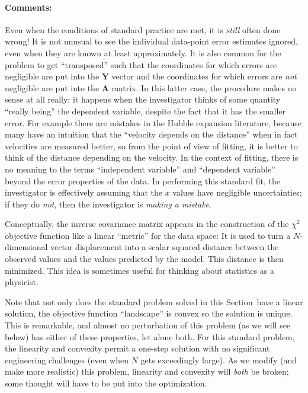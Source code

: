 \documentclass[12pt,twoside]{article}
\newcommand{\sectionname}{Section}
\newcommand{\commentsname}{Comments}
\newcounter{problem}
\newenvironment{comments}{\paragraph{\commentsname:}}{}
\newcommand{\mmatrix}[1]{\boldsymbol{#1}}
\newcommand{\mA}{\mmatrix{A}}
\newcommand{\mY}{\mmatrix{Y}}
\begin{document}
\begin{comments}
Even when the conditions of standard practice are met, it is
\emph{still} often done wrong!  It is not unusual to see the
individual data-point error estimates ignored, even when they are
known at least approximately.  It is also common for the problem to
get ``transposed'' such that the coordinates for which errors are
negligible are put into the $\mY$ vector and the coordinates for which
errors are \emph{not} negligible are put into the $\mA$ matrix.  In
this latter case, the procedure makes no sense at all really; it
happens when the investigator thinks of some quantity ``really being''
the dependent variable, despite the fact that it has the smaller
error.  For example there are mistakes in the Hubble expansion
literature, because many have an intuition that the ``velocity depends
on the distance'' when in fact velocities are measured better, so from
the point of view of fitting, it is better to think of the distance
depending on the velocity.  In the context of fitting, there is no
meaning to the terms ``independent variable'' and ``dependent
variable'' beyond the error properties of the data.  In performing
this standard fit, the investigator is effectively assuming that the
$x$ values have negligible uncertainties; if they do \emph{not}, then
the investigator is \emph{making a mistake}.

Conceptually, the inverse covariance matrix appears in the
construction of the $\chi^2$ objective function like a linear
``metric'' for the data space: It is used to turn a $N$-dimensional
vector displacement into a scalar squared distance between the
observed values and the values predicted by the model. This distance
is then minimized.  This idea is sometimes useful for thinking about
statistics as a physicist.

Note that not only does the standard problem solved in this
\sectionname\ have a linear solution, the objective function
``landscape'' is convex so the solution is unique.  This is
remarkable, and almost no perturbation of this problem (as we will see
below) has either of these properties, let alone both.  For this
standard problem, the linearity and convexity permit a one-step
solution with no significant engineering challenges (even when $N$
gets exceedingly large).  As we modify (and make more realistic) this
problem, linearity and convexity will \emph{both} be broken; some
thought will have to be put into the optimization.
\end{comments}
\end{document}
